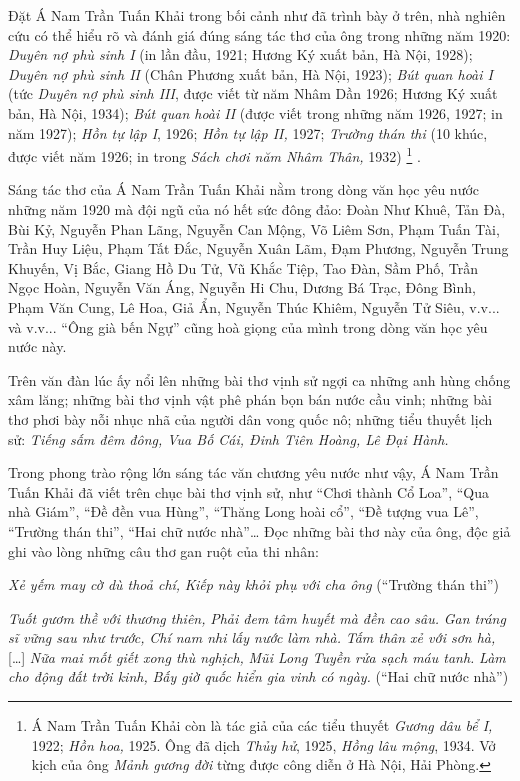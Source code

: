 \documentclass[../main.tex]{subfiles}
\begin{document}
\begin{multicols}{2}
Đặt Á Nam Trần Tuấn Khải trong bối cảnh như đã trình bày ở trên, nhà nghiên cứu có thể hiểu rõ và đánh giá đúng sáng tác thơ của ông trong những năm 1920: \textit{Duyên nợ phù sinh I} (in lần đầu, 1921; Hương Ký xuất bản, Hà Nội, 1928); \textit{Duyên nợ phù sinh II} (Chân Phương xuất bản, Hà Nội, 1923); \textit{Bút quan hoài I} (tức \textit{Duyên nợ phù sinh III}, được viết từ năm Nhâm Dần 1926; Hương Ký xuất bản, Hà Nội, 1934); \textit{Bút quan hoài II }(được viết trong những năm 1926, 1927; in năm 1927); \textit{Hồn tự lập I}, 1926; \textit{Hồn tự lập II, }1927; \textit{Trường thán thi} (10 khúc, được viết năm 1926; in trong \textit{Sách chơi năm Nhâm Thân, }1932) \footnote{
Á Nam Trần Tuấn Khải còn là tác giả của các tiểu thuyết \textit{Gương dâu bể I, }1922; \textit{Hồn hoa, }1925. Ông đã dịch \textit{Thủy hử}, 1925, \textit{Hồng lâu mộng}, 1934. Vở kịch của ông \textit{Mảnh gương đời }từng được công diễn ở Hà Nội, Hải Phòng.} . 
 
Sáng tác thơ của Á Nam Trần Tuấn Khải nằm trong dòng văn học yêu nước những năm 1920 mà đội ngũ của nó hết sức đông đảo: Đoàn Như Khuê, Tản Đà, Bùi Kỷ, Nguyễn Phan Lãng, Nguyễn Can Mộng, Võ Liêm Sơn, Phạm Tuấn Tài, Trần Huy Liệu, Phạm Tất Đắc, Nguyễn Xuân Lãm, Đạm Phương, Nguyễn Trung Khuyến, Vị Bắc, Giang Hồ Du Tử, Vũ Khắc Tiệp, Tao Đàn, Sầm Phố, Trần Ngọc Hoàn, Nguyễn Văn Áng, Nguyễn Hi Chu, Dương Bá Trạc, Đông Bình, Phạm Văn Cung, Lê Hoa, Giả Ẩn, Nguyễn Thúc Khiêm, Nguyễn Tử Siêu, v.v... và v.v... “Ông già bến Ngự” cũng hoà giọng của mình trong dòng văn học yêu nước này. 
 
Trên văn đàn lúc ấy nổi lên những bài thơ vịnh sử ngợi ca những anh hùng chống xâm lăng; những bài thơ vịnh vật phê phán bọn bán nước cầu vinh; những bài thơ phơi bày nỗi nhục nhã của người dân vong quốc nô; những tiểu thuyết lịch sử: \textit{Tiếng sấm đêm đông, Vua Bố Cái, Đinh Tiên Hoàng, Lê Đại Hành.} 
 
Trong phong trào rộng lớn sáng tác văn chương yêu nước như vậy, Á Nam Trần Tuấn Khải đã viết trên chục bài thơ vịnh sử, như “Chơi thành Cổ Loa”, “Qua nhà Giám”, “Đề đền vua Hùng”, “Thăng Long hoài cổ”, “Đề tượng vua Lê”, “Trường thán thi”, “Hai chữ nước nhà”… Đọc những bài thơ này của ông, độc giả ghi vào lòng những câu thơ gan ruột của thi nhân: 
\begin{blockquote}
        
\textit{Xẻ yếm may cờ dù thoả chí,}        
\textit{Kiếp này khỏi phụ với cha ông}        
(“Trường thán thi”) 
        
\textit{Tuốt gươm thề với thương thiên,}        
\textit{Phải đem tâm huyết mà đền cao sâu.}        
\textit{Gan tráng sĩ vững sau như trước,}        
\textit{Chí nam nhi lấy nước làm nhà.}        
\textit{Tấm thân xẻ với sơn hà,}        
[…]        
\textit{Nữa mai mốt giết xong thù nghịch,}        
\textit{Mũi Long Tuyền rửa sạch máu tanh.}        
\textit{Làm cho động đất trời kinh,}        
\textit{Bấy giờ quốc hiển gia vinh có ngày.}        
(“Hai chữ nước nhà”) 


\end{blockquote}
\end{multicols}
\end{document}
